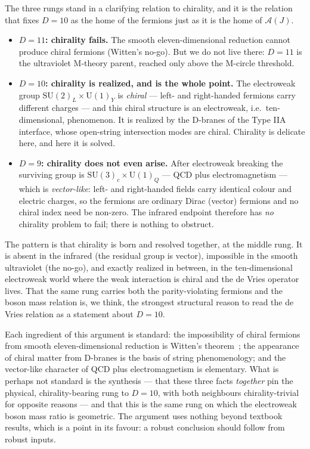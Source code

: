 \documentclass[11pt]{article}
\theoremstyle{plain}
\theoremstyle{definition}
\newcommand{\cA}{\mathcal{A}}
\newcommand{\SU}{\mathrm{SU}}
\newcommand{\U}{\mathrm{U}}
\begin{document}
The three rungs stand in a clarifying relation to chirality, and it is the
relation that fixes $D=10$ as the home of the fermions just as it is the home
of $\cA(J)$.
\begin{itemize}
\item \textbf{$D=11$: chirality fails.} The smooth eleven-dimensional
reduction cannot produce chiral fermions (Witten's no-go). But we do not live
there: $D=11$ is the ultraviolet M-theory parent, reached only above the
M-circle threshold.
\item \textbf{$D=10$: chirality is realized, and is the whole point.} The
electroweak group $\SU(2)_L\times\U(1)_Y$ is \emph{chiral} --- left- and
right-handed fermions carry different charges --- and this chiral structure is
an electroweak, i.e.\ ten-dimensional, phenomenon. It is realized by the
D-branes of the Type IIA interface, whose open-string intersection modes are
chiral. Chirality is delicate here, and here it is
solved.
\item \textbf{$D=9$: chirality does not even arise.} After electroweak
breaking the surviving group is $\SU(3)_c\times\U(1)_Q$ --- QCD plus
electromagnetism --- which is \emph{vector-like}: left- and right-handed
fields carry identical colour and electric charges, so the fermions are
ordinary Dirac (vector) fermions and no chiral index need be non-zero. The
infrared endpoint therefore has \emph{no} chirality problem to fail; there is
nothing to obstruct.
\end{itemize}
The pattern is that chirality is born and resolved together, at the middle
rung. It is absent in the infrared (the residual group is vector), impossible
in the smooth ultraviolet (the no-go), and exactly realized in between, in the
ten-dimensional electroweak world where the weak interaction is chiral and the
de Vries operator lives. That the same rung carries both the parity-violating
fermions and the boson mass relation is, we think, the strongest structural
reason to read the de Vries relation as a statement about $D=10$.

Each ingredient of this argument is standard: the impossibility of chiral
fermions from smooth eleven-dimensional reduction is Witten's
theorem~\cite{Witten1981}; the appearance of chiral matter from D-branes is
the basis of string phenomenology; and the vector-like character of QCD plus
electromagnetism is elementary. What is perhaps not standard is the
synthesis --- that these three facts \emph{together} pin the physical,
chirality-bearing rung to $D=10$, with both neighbours chirality-trivial for
opposite reasons --- and that this is the same rung on which the electroweak
boson mass ratio is geometric. The argument uses nothing beyond textbook
results, which is a point in its favour: a robust conclusion should follow
from robust inputs.
\end{document}
